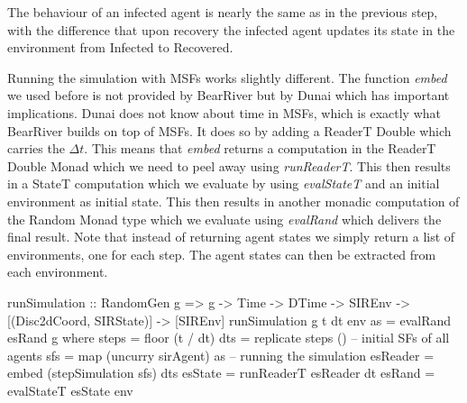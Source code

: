 The behaviour of an infected agent is nearly the same as in the previous step, with the difference that upon recovery the infected agent updates its state in the environment from Infected to Recovered.

Running the simulation with MSFs works slightly different. The function \textit{embed} we used before is not provided by BearRiver but by Dunai which has important implications. Dunai does not know about time in MSFs, which is exactly what BearRiver builds on top of MSFs. It does so by adding a ReaderT Double which carries the $\Delta t$. This means that \textit{embed} returns a computation in the ReaderT Double Monad which we need to peel away using \textit{runReaderT}. This then results in a StateT computation which we evaluate by using \textit{evalStateT} and an initial environment as initial state. This then results in another monadic computation of the Random Monad type which we evaluate using \textit{evalRand} which delivers the final result. Note that instead of returning agent states we simply return a list of environments, one for each step. The agent states can then be extracted from each environment.

\begin{HaskellCode}
runSimulation :: RandomGen g => g -> Time -> DTime 
  -> SIREnv -> [(Disc2dCoord, SIRState)] -> [SIREnv]
runSimulation g t dt env as = evalRand esRand g
  where
    steps    = floor (t / dt)
    dts      = replicate steps ()
    -- initial SFs of all agents
    sfs      = map (uncurry sirAgent) as   
    -- running the simulation   
    esReader = embed (stepSimulation sfs) dts 
    esState  = runReaderT esReader dt 
    esRand   = evalStateT esState env     
\end{HaskellCode}

